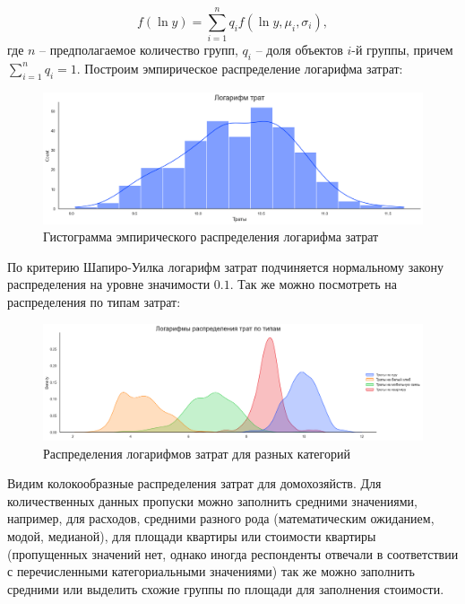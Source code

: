 \documentclass[12pt]{report}
\begin{document}
    \useshortskip
    \[
        f(\ln y) = \sum\limits_{i=1}^n q_i f(\ln y, \mu_i, \sigma_i),
    \] 
    \useshortskip
    где $n$ -- предполагаемое количество групп, $q_i$ -- доля объектов $i$-й группы, причем $\sum\limits_{i=1}^n q_i = 1$. Построим эмпирическое распределение логарифма затрат:
    \begin{figure}[H]
      \centering
      \includegraphics[scale=0.5]{title/outcome.png}
      \caption{Гистограмма эмпирического распределения логарифма затрат}
    \end{figure}
    По критерию Шапиро-Уилка логарифм затрат подчиняется нормальному закону распределения на уровне значимости $0.1$.
    Так же можно посмотреть на распределения по типам затрат:
    \begin{figure}[H]
      \centering
      \includegraphics[scale=0.45]{title/outcome_different.png}
      \caption{Распределения логарифмов затрат для разных категорий}
    \end{figure}
    \par
    Видим колокообразные распределения затрат для домохозяйств. Для количественных данных пропуски можно заполнить средними значениями, например, для расходов, средними разного рода (математическим ожиданием, модой, медианой), для площади квартиры или стоимости квартиры (пропущенных значений нет, однако иногда респонденты отвечали в соответствии с перечисленными категориальными значениями) так же можно заполнить средними или выделить схожие группы по площади для заполнения стоимости. 
\end{document}
